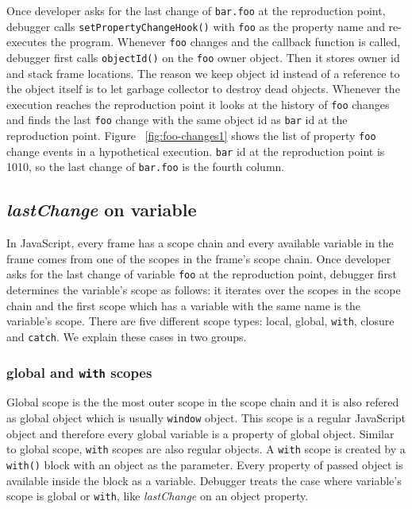 \documentclass[preprint]{sigplanconf}
\begin{document}
Once developer asks for the last change of \texttt{bar.foo} at the reproduction point, debugger calls \texttt{setPropertyChangeHook()} with \texttt{foo} as the property name and re-executes the program. Whenever \texttt{foo} changes and the callback function is called, debugger first calls \texttt{objectId()} on the \texttt{foo} owner object. Then it stores owner id and stack frame locations. The reason we keep object id instead of a reference to the object itself is to let garbage collector to destroy dead objects. Whenever the execution reaches the reproduction point it looks at the history of \texttt{foo} changes and finds the last \texttt{foo} change with the same object id as \texttt{bar} id at the reproduction point. Figure ~\ref{fig:foo-changes1} shows the list of property \texttt{foo} change events in a hypothetical execution. \texttt{bar} id at the reproduction point is 1010, so the last change of \texttt{bar.foo} is the fourth column.

\subsection{\textit{lastChange} on variable} 
In JavaScript, every frame has a scope chain and every available variable in the frame comes from one of the scopes in the frame's scope chain. Once developer asks for the last change of variable \texttt{foo} at the reproduction point, debugger first determines the variable's scope as follows: it iterates over the scopes in the scope chain and the first scope which has a variable with the same name is the variable's scope. There are five different scope types: local, global, \texttt{with}, closure and \texttt{catch}. We explain these cases in two groups.


\subsubsection{global and \texttt{with} scopes}
Global scope is the the most outer scope in the scope chain and it is also refered as global object which is usually \texttt{window} object. This scope is a regular JavaScript object and therefore every global variable is a property of global object. Similar to global scope, \texttt{with} scopes are also regular objects. A \texttt{with} scope is created by a \texttt{with()} block with an object as the parameter. Every property of passed object is available inside the block as a variable. Debugger treats the case where variable's scope is global or \texttt{with}, like \textit{lastChange} on an object property. 
\end{document}
